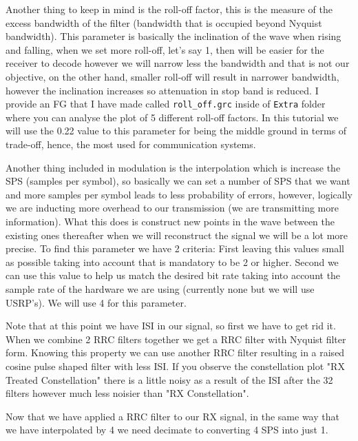 \documentclass[a4paper, 10pt, conference]{ieeeconf}      %
\begin{document}
    
    Another thing to keep in mind is the roll-off factor, this is the measure of the excess bandwidth of the filter (bandwidth that is occupied beyond Nyquist bandwidth). This parameter is basically the inclination of the wave when rising and falling, when we set more roll-off, let's say 1, then will be easier for the receiver to decode however we will narrow less the bandwidth and that is not our objective, on the other hand, smaller roll-off will result in narrower bandwidth, however the inclination increases so attenuation in stop band is reduced.
    I provide an FG that I have made called \verb|roll_off.grc| inside of \verb|Extra| folder where you can analyse the plot of 5 different roll-off factors. In this tutorial we will use the 0.22 value to this parameter for being the middle ground in terms of trade-off, hence, the most used for communication systems.
    
    Another thing included in modulation is the interpolation which is increase the SPS (samples per symbol), so basically we can set a number of SPS that we want and more samples per symbol leads to less probability of errors, however, logically we are inducting more overhead to our transmission (we are transmitting more information). What this does is construct new points in the wave between the existing ones thereafter when we will reconstruct the signal we will be a lot more precise. To find this parameter we have 2 criteria:  First leaving this values small as possible taking into account that is mandatory to be 2 or higher. Second we can use this value to help us match the desired bit rate taking into account the sample rate of the hardware we are using (currently none but we will use USRP's). We will use 4 for this parameter.
    
    Note that at this point we have ISI in our signal, so first we have to get rid it. When we combine 2 RRC filters together we get a RRC filter with Nyquist filter form. Knowing this property we can use another RRC filter resulting in a raised cosine pulse shaped filter with less ISI. If you observe the constellation plot "RX Treated Constellation" there is a little noisy as a result of the ISI after the 32 filters however much less noisier than "RX Constellation". 
    
    Now that we have applied a RRC filter to our RX signal, in the same way that we have interpolated by 4 we need decimate to converting 4 SPS into just 1.
\end{document}
